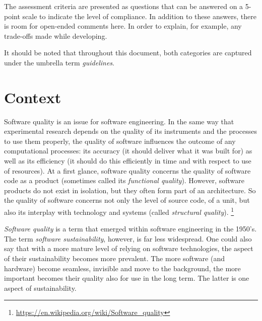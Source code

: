 \documentclass[a4paper,11pt]{article}
\begin{document}
The assessment criteria are presented as questions that can be answered on a
5-point scale to indicate the level of compliance. In addition to these
answers, there is room for open-ended comments here.  In order to explain, for
example, any trade-offs made while developing. 

It should be noted that throughout this document, both categories are captured
under the umbrella term \textit{guidelines}.  

\section{Context}

Software quality is an issue for software engineering. In the same way that
experimental research depends on the quality of its instruments and the
processes to use them properly, the quality of software influences the outcome
of any computational processes: its accuracy (it should deliver what it
was built for) as well as its efficiency (it should do this efficiently in
time and with respect to use of resources). At a first glance, software
quality concerns the quality of software code as a product (sometimes
called its \emph{functional quality}). However, software products do not exist in
isolation, but they often form part of an architecture. So the quality of software
concerns not only the level of source code, of a unit, but also its interplay
with technology and systems (called \emph{structural quality}).
\footnote{\url{https://en.wikipedia.org/wiki/Software\_quality}}

\textit{Software quality} is a term that emerged within software
engineering in the 1950's. The term \textit{software sustainability}, however, is far less widespread. One
could also say that with a more mature level of relying on software
technologies, the aspect of their sustainability becomes more prevalent. The
more software (and hardware) become seamless, invisible and move to the
background, the more important becomes their quality also for use in the long
term. The latter is one aspect of sustainability.
\end{document}
